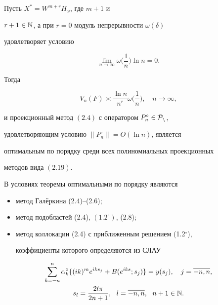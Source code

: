 \begin{thm}


Пусть $X^* = W^{m+r}H_\omega$, где $m+1$  и


$r+1\in \Bbb {N}$, а при $r=0$ модуль непрерывности $\omega(\delta)$


удовлетворяет условию


\begin{equation}


\lim\limits_{n\to \infty} \omega\bigg(\frac{1}{n}\bigg)\ln n = 0.


\end{equation}


Тогда


\begin{equation}


V_n(F) \asymp \frac{\ln


n}{n^r}\omega\bigg(\frac{1}{n}\bigg),\quad n\to \infty,


\end{equation}


и проекционный метод $(2.4)$ с оператором $P_n^\circ\in \cal{P}_n$,


удовлетворяющим условию $\|P_n^\circ\| = O(\ln n)$, является


оптимальным по порядку среди всех полиномиальных проекционных


методов вида $(2.19)$.


\end{thm}





\begin{cornonum}


В условиях теоремы оптимальными по порядку являются


\begin{itemize}


\item[а)] метод Гал\"еркина (2.4)--(2.6);


\item[б)] метод подобластей (2.4), $(1.2^\circ)$, (2.8);


\item[в)] метод коллокации (2.4) с приближенным решением (1.2$^\circ$),


коэффициенты которого определяются из СЛАУ


\end{itemize}


\begin{gather}


\suml_{k=-n}^n\alpha_k^\circ \{(ik)^m e^{iks_j}+B(e^{iks};s_j)\} =


y(s_j),\quad j=\ol{-n,n}, \\


%


s_l = \frac{2l\pi}{2n+1},\ \ l = \ol{-n,n},\ \ n+1\in \N.


\end{gather}


\end{cornonum}





